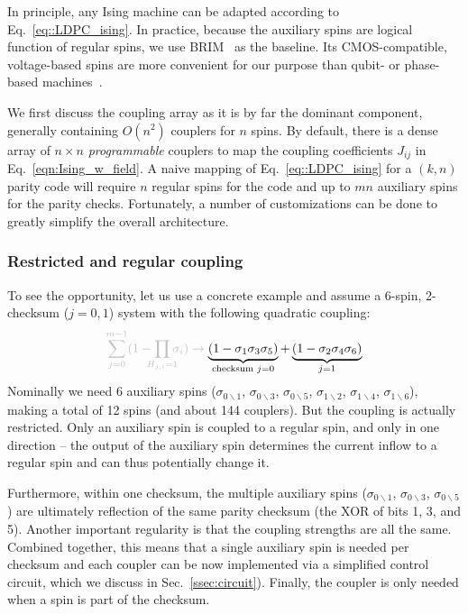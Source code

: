 In principle, any Ising machine can be adapted according to Eq.~\ref{eq::LDPC_ising}. In practice,
because the auxiliary spins are logical function of regular spins, we use BRIM~\cite{afoakwa.hpca21}
as the baseline. Its CMOS-compatible, voltage-based spins are more convenient for our purpose
than qubit- or phase-based machines~\cite{dwave-timing, wang2019oim}.

We first discuss the coupling array as it is by far the dominant component, generally containing $O(n^2)$ couplers
for $n$ spins. By default, there is a dense array of $n\times n$ \emph{programmable}
couplers to map the coupling coefficients $J_{ij}$ in Eq.~\ref{eqn:Ising_w_field}. A naive mapping
of Eq.~\ref{eq::LDPC_ising} for a $(k,n)$ parity code will require $n$ regular spins for the code
and up to $mn$ auxiliary spins for the parity checks. Fortunately, 
a number of customizations can be done to greatly simplify the overall architecture. 

\subsubsection{\bf Restricted and regular coupling}

To see the opportunity, let us use a concrete example and
assume a 6-spin, 2-checksum ($j=0,1$) system  
with the following quadratic coupling: \begin{equation}
\color{lightgray}\sum_{j=0}^{m-1}(1-\prod_{\mathclap{ H_{j,i}=1}} \sigma_i) \rightarrow \color{black}
\underbrace{(1-\sigma_1\sigma_3\sigma_5)}_{\text{checksum } j=0}+\underbrace{(1-\sigma_2\sigma_4\sigma_6)}_{j=1}
\label{eq:chksum_ex}
\end{equation}
Nominally we need 6 auxiliary spins ($\sigma_{0\backslash 1}$,
$\sigma_{0\backslash 3}$,
$\sigma_{0\backslash 5}$,
$\sigma_{1\backslash 2}$,
$\sigma_{1\backslash 4}$,
$\sigma_{1\backslash 6}$), making a total of 12 spins (and about 144 couplers).
But the coupling is actually restricted. Only an auxiliary spin is coupled to
a regular spin, and only in one direction -- the output of the auxiliary spin determines the current inflow to a regular
spin and can thus potentially change it.

Furthermore, within one checksum, the multiple auxiliary spins (\eg $\sigma_{0\backslash 1}$,
$\sigma_{0\backslash 3}$, $\sigma_{0\backslash 5}$) are ultimately reflection of the 
same parity checksum (the XOR of bits 1, 3, and 5). 
Another important regularity is that the coupling strengths are all the same. Combined
together, this means that a single auxiliary spin is needed per checksum and each 
coupler can be now implemented via a simplified control circuit, which we discuss
in Sec.~\ref{ssec:circuit}). Finally, the coupler is only needed when a spin is part
of the checksum.


